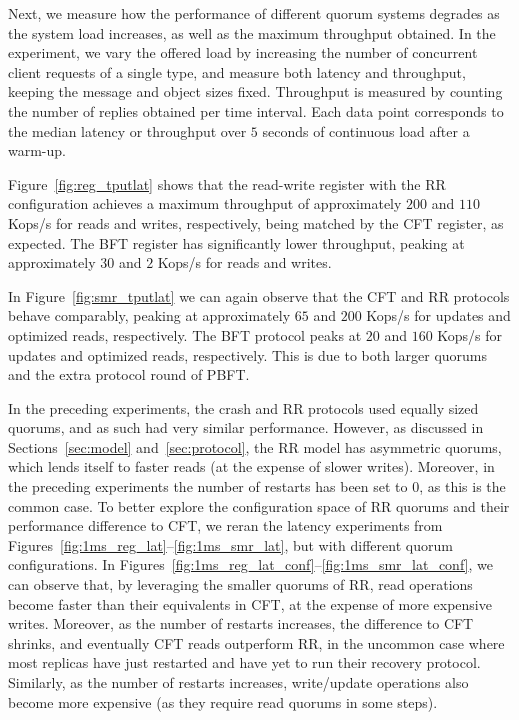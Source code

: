 Next, we measure how the performance of different quorum systems
degrades as the system load increases, as well as the maximum
throughput obtained. In the experiment, we vary the offered load by
increasing the number of concurrent client requests of a single type,
and measure both latency and throughput, keeping the message and
object sizes fixed. Throughput is measured by
counting the number of replies obtained per time interval.  Each
data point corresponds to the median latency or throughput over $5$
seconds of continuous load after a warm-up.
%

Figure~\ref{fig:reg_tputlat} shows that
the read-write register with the \ac{RR} configuration achieves a maximum
throughput of approximately $200$ and $110$ Kops/s for reads and
writes, respectively, being matched by the \ac{CFT} register, as
expected. The \ac{BFT} register has significantly lower throughput,
peaking at approximately $30$ and $2$ Kops/s for reads and
writes.

In Figure~\ref{fig:smr_tputlat} we can again observe that the \ac{CFT} and
\ac{RR} protocols behave comparably, peaking at
approximately $65$ and $200$ Kops/s for updates and optimized
reads, respectively. The \ac{BFT} protocol peaks at $20$ and $160$
Kops/s for updates and optimized reads, respectively. This is due
to both larger quorums and the extra protocol round of PBFT.


In the preceding experiments, the crash and
\ac{RR} protocols used equally sized quorums, and as such
had very similar performance. However, as
discussed in Sections~\ref{sec:model} and~\ref{sec:protocol},
the \ac{RR} model has asymmetric quorums, which lends
itself to faster reads (at the expense of slower writes).
Moreover, in the preceding experiments the number of restarts has
been set to $0$, as this is the common case. To better explore
the configuration space of \ac{RR} quorums and their
performance difference to \ac{CFT}, we reran the latency experiments
from Figures~\ref{fig:1ms_reg_lat}--\ref{fig:1ms_smr_lat}, but with
different quorum configurations. In
Figures~\ref{fig:1ms_reg_lat_conf}--\ref{fig:1ms_smr_lat_conf}, we can
observe that, by leveraging the smaller quorums of \ac{RR}, read
operations become faster than their equivalents in \ac{CFT}, at the
expense of more expensive writes. Moreover, as the number of
restarts increases, the difference to \ac{CFT} shrinks, and
eventually \ac{CFT} reads outperform \ac{RR}, in
the uncommon case where most replicas have just restarted and
have yet to run their recovery protocol. Similarly, as the number
of restarts increases, write/update operations also become more
expensive (as they require read quorums in some steps).

